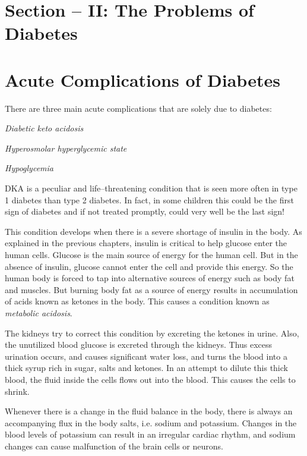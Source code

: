 
\chapter{Section – II: The Problems of Diabetes}

\chapter{Acute Complications of Diabetes}

There are three main acute complications that are solely due to diabetes:

\item \textit{Diabetic keto acidosis}

 \item \textit{Hyperosmolar hyperglycemic state}

 \item \textit{Hypoglycemia}


DKA is a peculiar and life–threatening condition that is seen more often in type 1 diabetes than type 2 diabetes. In fact, in some children this could be the first sign of diabetes and if not treated promptly, could very well be the last sign!

This condition develops when there is a severe shortage of insulin in the body. As explained in the previous chapters, insulin is critical to help glucose enter the human cells. Glucose is the main source of energy for the human cell. But in the absence of insulin, glucose cannot enter the cell and provide this energy. So the human body is forced to tap into alternative sources of energy such as body fat and muscles. But burning body fat as a source of energy results in accumulation of acids known as ketones in the body. This causes a condition known as \textit{metabolic acidosis}.

The kidneys try to correct this condition by excreting the ketones in urine. Also, the unutilized blood glucose is excreted through the kidneys. Thus excess urination occurs, and causes significant water loss, and turns the blood into a thick syrup rich in sugar, salts and ketones. In an attempt to dilute this thick blood, the fluid inside the cells flows out into the blood. This causes the cells to shrink.

Whenever there is a change in the fluid balance in the body, there is always an accompanying flux in the body salts, i.e. sodium and potassium. Changes in the blood levels of potassium can result in an irregular cardiac rhythm, and sodium changes can cause malfunction of the brain cells or neurons.

